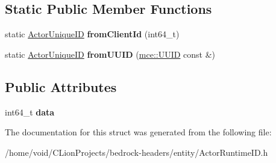 \subsection*{Static Public Member Functions}
\begin{DoxyCompactItemize}
\item 
\mbox{\label{struct_actor_unique_i_d_a21d232a167e8353743197e41140deb6c}} 
static \mbox{\hyperlink{struct_actor_unique_i_d}{Actor\+Unique\+ID}} {\bfseries from\+Client\+Id} (int64\+\_\+t)
\item 
\mbox{\label{struct_actor_unique_i_d_a67273c70509b1eef2761afb12e276c41}} 
static \mbox{\hyperlink{struct_actor_unique_i_d}{Actor\+Unique\+ID}} {\bfseries from\+U\+U\+ID} (\mbox{\hyperlink{structmce_1_1_u_u_i_d}{mce\+::\+U\+U\+ID}} const \&)
\end{DoxyCompactItemize}
\subsection*{Public Attributes}
\begin{DoxyCompactItemize}
\item 
\mbox{\label{struct_actor_unique_i_d_a4a2eef16367687fbaac397743d30b517}} 
int64\+\_\+t {\bfseries data}
\end{DoxyCompactItemize}


The documentation for this struct was generated from the following file\+:\begin{DoxyCompactItemize}
\item 
/home/void/\+C\+Lion\+Projects/bedrock-\/headers/entity/Actor\+Runtime\+I\+D.\+h\end{DoxyCompactItemize}

